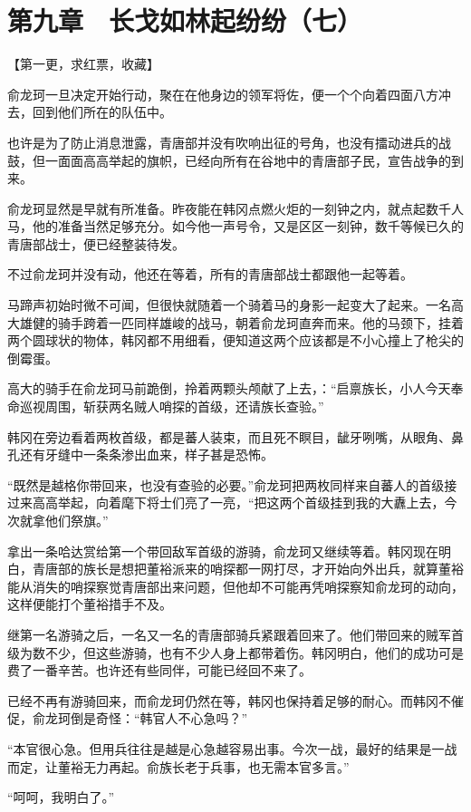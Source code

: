 \section{第九章　长戈如林起纷纷（七）}

【第一更，求红票，收藏】

俞龙珂一旦决定开始行动，聚在在他身边的领军将佐，便一个个向着四面八方冲去，回到他们所在的队伍中。

也许是为了防止消息泄露，青唐部并没有吹响出征的号角，也没有擂动进兵的战鼓，但一面面高高举起的旗帜，已经向所有在谷地中的青唐部子民，宣告战争的到来。

俞龙珂显然是早就有所准备。昨夜能在韩冈点燃火炬的一刻钟之内，就点起数千人马，他的准备当然足够充分。如今他一声号令，又是区区一刻钟，数千等候已久的青唐部战士，便已经整装待发。

不过俞龙珂并没有动，他还在等着，所有的青唐部战士都跟他一起等着。

马蹄声初始时微不可闻，但很快就随着一个骑着马的身影一起变大了起来。一名高大雄健的骑手跨着一匹同样雄峻的战马，朝着俞龙珂直奔而来。他的马颈下，挂着两个圆球状的物体，韩冈都不用细看，便知道这两个应该都是不小心撞上了枪尖的倒霉蛋。

高大的骑手在俞龙珂马前跪倒，拎着两颗头颅献了上去，：“启禀族长，小人今天奉命巡视周围，斩获两名贼人哨探的首级，还请族长查验。”

韩冈在旁边看着两枚首级，都是蕃人装束，而且死不瞑目，龇牙咧嘴，从眼角、鼻孔还有牙缝中一条条渗出血来，样子甚是恐怖。

“既然是越格你带回来，也没有查验的必要。”俞龙珂把两枚同样来自蕃人的首级接过来高高举起，向着麾下将士们亮了一亮，“把这两个首级挂到我的大纛上去，今次就拿他们祭旗。”

拿出一条哈达赏给第一个带回敌军首级的游骑，俞龙珂又继续等着。韩冈现在明白，青唐部的族长是想把董裕派来的哨探都一网打尽，才开始向外出兵，就算董裕能从消失的哨探察觉青唐部出来问题，但他却不可能再凭哨探察知俞龙珂的动向，这样便能打个董裕措手不及。

继第一名游骑之后，一名又一名的青唐部骑兵紧跟着回来了。他们带回来的贼军首级为数不少，但这些游骑，也有不少人身上都带着伤。韩冈明白，他们的成功可是费了一番辛苦。也许还有些同伴，可能已经回不来了。

已经不再有游骑回来，而俞龙珂仍然在等，韩冈也保持着足够的耐心。而韩冈不催促，俞龙珂倒是奇怪：“韩官人不心急吗？”

“本官很心急。但用兵往往是越是心急越容易出事。今次一战，最好的结果是一战而定，让董裕无力再起。俞族长老于兵事，也无需本官多言。”

“呵呵，我明白了。”

